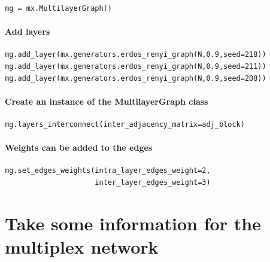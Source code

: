 \documentclass[11pt]{article}
\begin{document}
\begin{verbatim}
mg = mx.MultilayerGraph()
\end{verbatim}

\paragraph{Add layers}\label{add-layers}

\begin{verbatim}
mg.add_layer(mx.generators.erdos_renyi_graph(N,0.9,seed=218))
mg.add_layer(mx.generators.erdos_renyi_graph(N,0.9,seed=211))
mg.add_layer(mx.generators.erdos_renyi_graph(N,0.9,seed=208))
\end{verbatim}

\paragraph{Create an instance of the MultilayerGraph
class}\label{create-an-instance-of-the-multilayergraph-class-1}

\begin{verbatim}
mg.layers_interconnect(inter_adjacency_matrix=adj_block)
\end{verbatim}

\paragraph{Weights can be added to the
edges}\label{weights-can-be-added-to-the-edges-1}

\begin{verbatim}
mg.set_edges_weights(intra_layer_edges_weight=2,
                     inter_layer_edges_weight=3)
\end{verbatim}

\section{Take some information for the multiplex
network}\label{take-some-information-for-the-multiplex-network}
\end{document}
